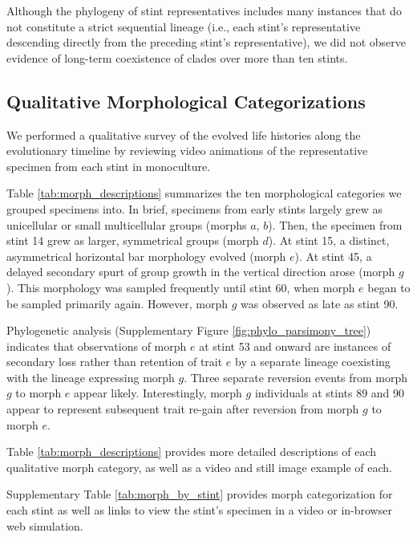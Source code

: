 Although the phylogeny of stint representatives includes many instances that do not constitute a strict sequential lineage (i.e., each stint's representative descending directly from the preceding stint's representative), we did not observe evidence of long-term coexistence of clades over more than ten stints.

\subsection{Qualitative Morphological Categorizations}



We performed a qualitative survey of the evolved life histories along the evolutionary timeline by reviewing video animations of the representative specimen from each stint in monoculture.

Table \ref{tab:morph_descriptions} summarizes the ten morphological categories we grouped specimens into.
In brief, specimens from early stints largely grew as unicellular or small multicellular groups (morphs $a$, $b$).
Then, the specimen from stint 14 grew as larger, symmetrical groups (morph $d$).
At stint 15, a distinct, asymmetrical horizontal bar morphology evolved (morph $e$).
At stint 45, a delayed secondary spurt of group growth in the vertical direction arose (morph $g$).
This morphology was sampled frequently until stint 60, when morph $e$ began to be sampled primarily again.
However, morph $g$ was observed as late as stint 90.

Phylogenetic analysis (Supplementary Figure \ref{fig:phylo_parsimony_tree}) indicates that observations of morph $e$ at stint 53 and onward are instances of secondary loss rather than retention of trait $e$ by a separate lineage coexisting with the lineage expressing morph $g$.
Three separate reversion events from morph $g$ to morph $e$ appear likely.
Interestingly, morph $g$ individuals at stints 89 and 90 appear to represent subsequent trait re-gain after reversion from morph $g$ to morph $e$.

Table \ref{tab:morph_descriptions} provides more detailed descriptions of each qualitative morph category, as well as a video and still image example of each.

Supplementary Table \ref{tab:morph_by_stint} provides morph categorization for each stint as well as links to view the stint's specimen in a video or in-browser web simulation.

